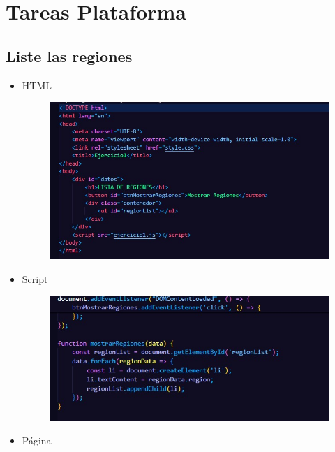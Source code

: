 \documentclass{article}
\begin{document}
	\clearpage

	\section{Tareas Plataforma}
	\subsection{Liste las regiones}
	\begin{itemize}
		\item HTML
		\begin{figure}[H]
			\centering
			\includegraphics[width=1.0\textwidth,keepaspectratio]{img/Ejer1T2HTML.jpg}
		\end{figure}
		\item Script
		\begin{figure}[H]
			\centering
			\includegraphics[width=1.0\textwidth,keepaspectratio]{img/Ejer1T2Script.jpg}
		\end{figure}
		\item Página
		\begin{figure}[H]

\end{figure}
\end{itemize}
\end{document}
